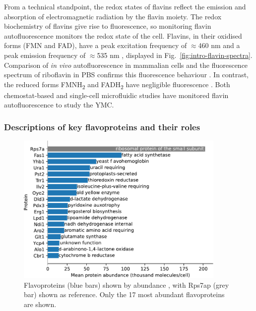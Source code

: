 From a technical standpoint, the redox states of flavins reflect the emission and absorption of electromagnetic radiation by the flavin moiety.
The redox biochemistry of flavins give rise to fluorescence, so monitoring flavin autofluorescence monitors the redox state of the cell.
Flavins, in their oxidised forms (FMN and FAD), have a peak excitation frequency of $\approx$460 nm and a peak emission frequency of $\approx$535 nm \parencite{maslankaAutofluorescenceYeastSaccharomyces2018, wagnieresVivoFluorescenceSpectroscopy1998}, displayed in Fig.\ \ref{fig:intro-flavin-spectra}.
Comparison of \textit{in vivo} autofluorescence in mammalian cells and the fluorescence spectrum of riboflavin in PBS confirms this fluorescence behaviour \parencite{aubinAutofluorescenceViableCultured1979}.
In contrast, the reduced forms FMNH\textsubscript{2} and FADH\textsubscript{2} have negligible fluorescence \parencite{mastersConfocalRedoxImaging1994}.
Both chemostat-based \parencite{sasidharanTimeStructureYeastMetabolism2012, murrayRedoxRegulationRespiring2011} and single-cell microfluidic studies \parencite{baumgartnerFlavinbasedMetabolicCycles2018} have monitored flavin autofluorescence to study the YMC.

\subsubsection{Descriptions of key flavoproteins and their roles}
\label{subsubsec:intro-flavin-biochem-descriptions}

\begin{figure}
  \centering
  \includegraphics[width=0.9\textwidth]{flavoprotein_abundance_bar}
  \caption[
    Flavoproteins shown by abundance
  ]{
    Flavoproteins (blue bars) shown by abundance \parencite{hoUnificationProteinAbundance2018}, with Rps7ap (grey bar) shown as reference.
    Only the 17 most abundant flavoproteins are shown.
    }
  \label{fig:intro-flavoprotein-abundance}
\end{figure}

